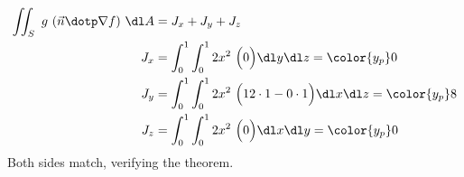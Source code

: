 \begin{enumerate}
          \begin{align}
              \iint_S\ g\ (\vec{n} \dotp \nabla f)\ \dl A
                  & = J_x + J_y + J_z                                               \\
              J_x & = \int_{0}^{1} \int_{0}^{1} 2x^2\ \Bigl( 0
              \Bigr) \dl y \dl z = \color{y_p} 0                                    \\
              J_y & = \int_{0}^{1} \int_{0}^{1} 2x^2\ \Bigl( 12 \cdot 1 - 0 \cdot 1
              \Bigr) \dl x \dl z = \color{y_p} 8                                    \\
              J_z & = \int_{0}^{1} \int_{0}^{1} 2x^2\ \Bigl( 0
              \Bigr) \dl x \dl y = \color{y_p} 0
          \end{align}
          Both sides match, verifying the theorem.


\end{enumerate}
